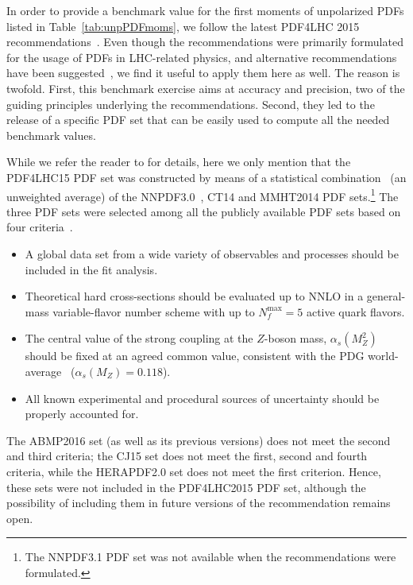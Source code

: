 In order to provide a benchmark value for the first moments of unpolarized PDFs
listed in Table~\ref{tab:unpPDFmoms}, we follow the latest PDF4LHC 2015 
recommendations~\cite{Butterworth:2015oua}.
%
Even though the recommendations were primarily formulated for the usage of PDFs
in LHC-related physics, and alternative recommendations have been 
suggested~\cite{Accardi:2016ndt}, we find it useful to apply them here as well.
%
The reason is twofold.
%
First, this benchmark exercise aims at accuracy and precision,  
two of the guiding principles underlying the recommendations.
%
Second, they led to the release of a specific PDF set
that can be easily used to compute all the needed benchmark values.

While we refer the reader to \cite{Butterworth:2015oua} for details,
here we only mention that the PDF4LHC15 PDF set was constructed by means of
a statistical combination~\cite{Carrazza:2015hva,Gao:2013bia,Watt:2012tq,
Carrazza:2015aoa} (an unweighted average) of the 
NNPDF3.0~\cite{Ball:2014uwa}, CT14 and MMHT2014 PDF sets.\footnote{The 
NNPDF3.1 PDF set was not available when the recommendations were formulated.}
%
The three PDF sets were selected among all the publicly available PDF sets
based on four criteria~\cite{Butterworth:2015oua}.
%
\begin{itemize}
%
\item A global data set from a wide variety of observables and processes
should be included in the fit analysis.
%
\item Theoretical hard cross-sections should be evaluated up to NNLO in a
general-mass variable-flavor number scheme with up to $N_f^\text{max}=5$ 
active quark flavors.
%
\item The central value of the strong coupling at the $Z$-boson mass,
$\alpha_s(M_Z^2)$ should be fixed at an agreed common value, consistent 
with the PDG world-average~\cite{Olive:2016xmw} ($\alpha_s(M_Z)=0.118$).
%
\item All known experimental and procedural sources of uncertainty should be 
properly accounted for.
%
\end{itemize}
%
The ABMP2016 set (as well as its previous versions) does not meet the second 
and third criteria; the CJ15 set does not meet the first, second and fourth
criteria, while the HERAPDF2.0 set does not meet the first criterion.
%
Hence, these sets were not included in the PDF4LHC2015 PDF set, although the 
possibility of including them in future versions of the recommendation 
remains open.

